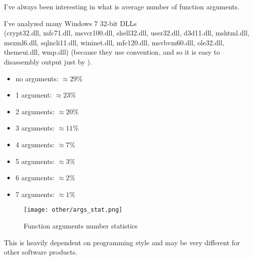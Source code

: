 \label{args_stat}

I've always been interesting in what is average number of function arguments.

I've analyzed many Windows 7 32-bit DLLs \\
(crypt32.dll, mfc71.dll, msvcr100.dll, shell32.dll, 
user32.dll, d3d11.dll, mshtml.dll, msxml6.dll, sqlncli11.dll, wininet.dll, mfc120.dll, msvbvm60.dll, ole32.dll, themeui.dll, wmp.dll) 
(because they use  convention, and so it is easy to  disassembly output just by ).

\begin{itemize}
\item no arguments: $\approx 29\%$
\item 1 argument: $\approx 23\%$
\item 2 arguments: $\approx 20\%$
\item 3 arguments: $\approx 11\%$
\item 4 arguments: $\approx 7\%$
\item 5 arguments: $\approx 3\%$
\item 6 arguments: $\approx 2\%$
\item 7 arguments: $\approx 1\%$
\end{itemize}

\begin{figure}[H]
\centering
\texttt{[image: other/args\_stat.png]}
\caption{Function arguments number statistics}
\end{figure}

This is heavily dependent on programming style and may be very different for other software products.


